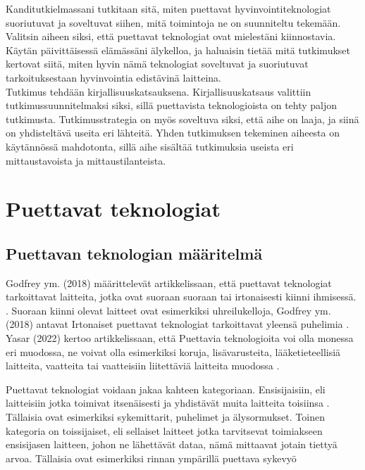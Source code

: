\documentclass[utf8,bachelor,finnish]{bachelor}
\begin{document}
  Kanditutkielmassani tutkitaan sitä, miten puettavat hyvinvointiteknologiat suoriutuvat ja soveltuvat siihen, mitä toimintoja ne on suunniteltu tekemään.
   Valitsin aiheen siksi, että puettavat teknologiat ovat mielestäni kiinnostavia. Käytän päivittäisessä elämässäni älykelloa, ja haluaisin tietää mitä tutkimukset kertovat
    siitä, miten hyvin nämä teknologiat soveltuvat ja suoriutuvat tarkoituksestaan hyvinvointia edistävinä laitteina.\\

  Tutkimus tehdään kirjallisuuskatsauksena. Kirjallisuuskatsaus valittiin tutkimussuunnitelmaksi siksi, sillä puettavista teknologioista on tehty paljon tutkimusta.
   Tutkimusstrategia on myös soveltuva siksi, että aihe on laaja, ja siinä on yhdisteltävä useita eri lähteitä. Yhden tutkimuksen tekeminen aiheesta on käytännössä mahdotonta,
    sillä aihe sisältää tutkimuksia useista eri mittaustavoista ja mittaustilanteista.
   
  
  

\chapter{Puettavat teknologiat}

\section{Puettavan teknologian määritelmä}
  Godfrey ym. (2018) määrittelevät artikkelissaan, että puettavat teknologiat tarkoittavat laitteita, jotka ovat suoraan suoraan tai irtonaisesti
   kiinni ihmisessä. \parencite{godfrey2018z}. Suoraan kiinni olevat laitteet ovat esimerkiksi uhreilukelloja,  Godfrey ym. (2018) antavat
    Irtonaiset puettavat teknologiat tarkoittavat yleensä puhelimia \parencite{godfrey2018z}. Yasar (2022) kertoo artikkelissaan, että
      Puettavia teknologioita voi olla monessa eri muodossa, ne voivat olla esimerkiksi koruja, lisävarusteita, lääketieteellisiä laitteita, vaatteita tai
      vaatteisiin liitettäviä laitteita muodossa \parencite{Yasar_what_wearable}.
    
  Puettavat teknologiat voidaan jakaa kahteen kategoriaan. Ensisijaisiin, eli laitteisiin jotka toimivat itsenäisesti
   ja yhdistävät muita laitteita toisiinsa \parencite{godfrey2018z}.  Tällaisia ovat esimerkiksi sykemittarit, puhelimet ja älysormukset.
    Toinen kategoria on toissijaiset, eli sellaiset laitteet jotka tarvitsevat toimiakseen ensisijasen laitteen, johon ne lähettävät dataa, 
     nämä mittaavat jotain tiettyä arvoa. Tällaisia ovat esimerkiksi rinnan ympärillä puettava sykevyö \parencite{godfrey2018z} \\
\end{document}
